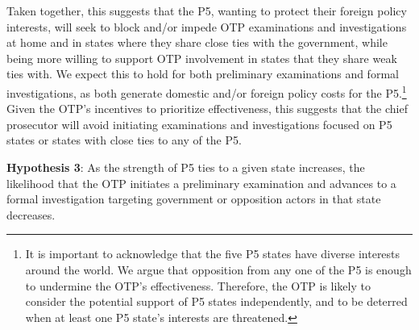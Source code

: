 Taken together, this suggests that the P5, wanting to protect their foreign policy interests, will seek to block and/or impede OTP examinations and investigations at home and in states where they share close ties with the government, while being more willing to support OTP involvement in states that they share weak ties with. We expect this to hold for both preliminary examinations and formal investigations, as both generate domestic and/or foreign policy costs for the P5.\footnote{It is important to acknowledge that the five P5 states have diverse interests around the world. We argue that opposition from any one of the P5 is enough to undermine the OTP's effectiveness. Therefore, the OTP is likely to consider the potential support of P5 states independently, and to be deterred when at least one P5 state's interests are threatened.} Given the OTP's incentives to prioritize effectiveness, this suggests that the chief prosecutor will avoid initiating examinations and investigations focused on P5 states or states with close ties to any of the P5.

\textbf{Hypothesis 3}: As the strength of P5 ties to a given state increases, the likelihood that the OTP initiates a preliminary examination and advances to a formal investigation targeting government or opposition actors in that state decreases.



















